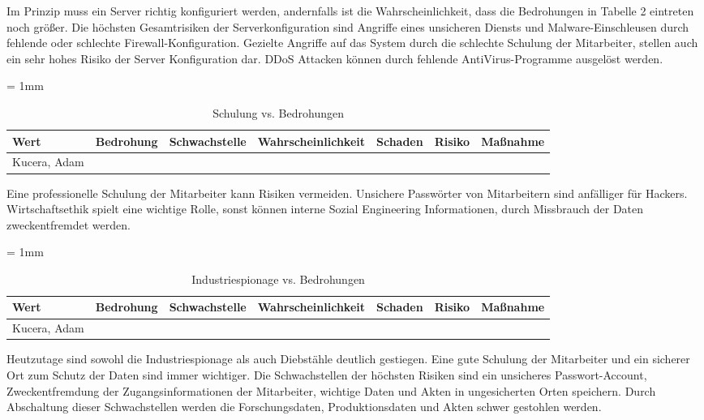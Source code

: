 Im Prinzip muss ein Server richtig konfiguriert werden, andernfalls ist die Wahrscheinlichkeit, dass die Bedrohungen in Tabelle 2 eintreten noch größer. 
Die höchsten Gesamtrisiken der Serverkonfiguration sind Angriffe eines unsicheren Diensts und Malware-Einschleusen durch fehlende oder schlechte Firewall-Konfiguration. 
Gezielte Angriffe auf das System durch die schlechte Schulung der Mitarbeiter, stellen auch ein sehr hohes Risiko der Server Konfiguration dar.  DDoS Attacken können durch fehlende AntiVirus-Programme ausgelöst werden.

\begin{table}[H]
	\sffamily
	\caption{Schulung vs. Bedrohungen}
	\tabulinesep = 1mm %
	\centering
		\begin{tabu} to 0.9\textwidth {| X[1] | X[1] | X[1] | X[1] | X[1] | X[1] | X[1] |}
		\hline
		\textbf{Wert} & \textbf{Bedrohung} & \textbf{Schwachstelle} & \textbf{Wahrscheinlichkeit} & \textbf{Schaden} & \textbf{Risiko} & \textbf{Maßnahme}\\
		\hline 
		Kucera, Adam &  & & & & &\\
		\hline
	\end{tabu}
\end{table}

Eine professionelle Schulung der Mitarbeiter kann Risiken vermeiden.
Unsichere Passwörter von Mitarbeitern sind anfälliger für Hackers. Wirtschaftsethik spielt  eine wichtige Rolle, sonst können interne Sozial Engineering Informationen, durch Missbrauch der Daten zweckentfremdet werden.

\begin{table}[H]
	\sffamily
	\caption{Industriespionage vs. Bedrohungen}
	\tabulinesep = 1mm %
	\centering
		\begin{tabu} to 0.9\textwidth {| X[1] | X[1] | X[1] | X[1] | X[1] | X[1] | X[1] |}
		\hline
		\textbf{Wert} & \textbf{Bedrohung} & \textbf{Schwachstelle} & \textbf{Wahrscheinlichkeit} & \textbf{Schaden} & \textbf{Risiko} & \textbf{Maßnahme}\\
		\hline 
		Kucera, Adam &  & & & & &\\
		\hline
	\end{tabu}
\end{table}

Heutzutage sind sowohl die Industriespionage als auch Diebstähle deutlich gestiegen. 
Eine gute Schulung der Mitarbeiter und ein sicherer Ort zum Schutz der Daten sind immer  wichtiger. 
Die Schwachstellen der höchsten Risiken sind ein unsicheres Passwort-Account, Zweckentfremdung der Zugangsinformationen der Mitarbeiter, wichtige Daten und Akten in ungesicherten Orten speichern. Durch Abschaltung dieser Schwachstellen werden die Forschungsdaten, Produktionsdaten und Akten schwer gestohlen werden.

